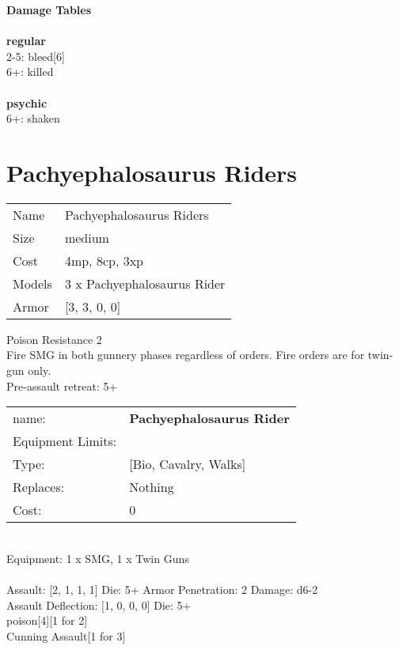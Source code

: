 {\bf Damage Tables} \\
\ \\ {\bf regular } \\
2-5: bleed[6] \\
6+: killed \\
\ \\ {\bf psychic } \\
6+: shaken \\










\pagebreak\pagebreak

\section{ Pachyephalosaurus Riders }

\begin{tabular}{ll}
  Name & Pachyephalosaurus Riders \\
  Size & medium\\
  Cost & 4mp, 8cp, 3xp\\
  Models & 3 x Pachyephalosaurus Rider\\
  Armor & [3, 3, 0, 0]\\
\end{tabular}

\noindent Poison Resistance 2\\ 
Fire SMG in both gunnery phases regardless of orders. Fire orders are for twin-gun only.\\ 
Pre-assault retreat: 5+\\ 


\noindent
\begin{tabular}{ll}
name: &{\bf Pachyephalosaurus Rider } \\
Equipment Limits: & \\
Type: &[Bio, Cavalry, Walks] \\
Replaces: &Nothing \\
Cost: & 0\\
\end{tabular}
\ \\
Equipment: 1 x SMG, 1 x Twin Guns \\
\ \\
Assault: [2, 1, 1, 1] Die: 5+ Armor Penetration: 2 Damage: d6-2 \\
Assault Deflection: [1, 0, 0, 0] Die: 5+\\
\indent poison[4][1 for 2]\\ 
Cunning Assault[1 for 3]\\ 
 
